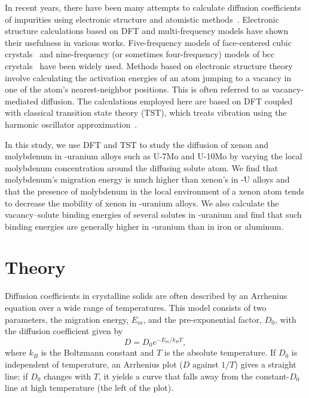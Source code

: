 In recent years, there have been many attempts to calculate diffusion
coefficients of impurities using electronic structure and atomistic
methods~\cite{adams1989self, blochl1993first, blochl1990first, frank1996first,
    janotti2004solute, krvcmar2005diffusion, milman1993free, sandberg2002self}.
Electronic structure calculations based on DFT and multi-frequency models have
shown their usefulness in various works.
Five-frequency models of face-centered cubic
    crystals~\cite{lidiard1955,lidiard1960, leclaire1956} and
nine-frequency (or sometimes four-frequency) models of bcc
crystals~\cite{leclaire1970, mehrer2007diffusion} have been widely used.
Methods based on electronic structure theory involve calculating the activation
energies of an atom jumping to a vacancy in one of the atom's nearest-neighbor
positions. This is often referred to as vacancy-mediated diffusion.
The calculations employed here are based on DFT coupled with classical
transition state theory (TST), which treats vibration using the
harmonic oscillator
approximation~\cite{vineyard1954theory, vineyard1957frequency}.

In this study, we use DFT and TST to study the diffusion of xenon and
molybdenum in \mbox{\textgamma-uranium} alloys such as U-7Mo and U-10Mo by
varying the local molybdenum concentration around the diffusing solute atom.
We find that molybdenum's migration energy is much higher than xenon's in
\textgamma-U alloys and that the presence of molybdenum in the local
environment of a xenon atom tends to
decrease the mobility of xenon in \textgamma-uranium alloys.
We also calculate the vacancy--solute binding energies of several solutes
in \textgamma-uranium and find that such binding energies are generally
higher in \textgamma-uranium than in iron or aluminum.

\section{Theory}\label{sec_theory}
Diffusion coefficients in crystalline solids are often described by an
Arrhenius equation over a wide range of temperatures. This model consists of
two parameters, the migration energy, $E_m$, and the pre-exponential factor,
$D_0$, with the diffusion coefficient given by
\begin{equation}
    D = D_0 e^{-E_m/k_B T},
\end{equation}
where $k_B$ is the Boltzmann constant and $T$ is the absolute temperature.
If $D_0$ is independent of temperature, an Arrhenius plot ($D$ against $1/T$)
gives a straight line; if $D_0$ changes with $T$, it yields a curve that falls
away from the constant-$D_0$ line at high temperature (the left of the plot).

